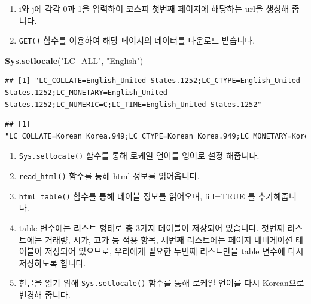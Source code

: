 \documentclass[]{book}
\newenvironment{Shaded}{\begin{snugshade}}{\end{snugshade}}
\newcommand{\DataTypeTok}[1]{\textcolor[rgb]{0.13,0.29,0.53}{#1}}
\newcommand{\DecValTok}[1]{\textcolor[rgb]{0.00,0.00,0.81}{#1}}
\newcommand{\KeywordTok}[1]{\textcolor[rgb]{0.13,0.29,0.53}{\textbf{#1}}}
\newcommand{\NormalTok}[1]{#1}
\newcommand{\OperatorTok}[1]{\textcolor[rgb]{0.81,0.36,0.00}{\textbf{#1}}}
\newcommand{\OtherTok}[1]{\textcolor[rgb]{0.56,0.35,0.01}{#1}}
\newcommand{\StringTok}[1]{\textcolor[rgb]{0.31,0.60,0.02}{#1}}
\providecommand{\tightlist}{%
  \setlength{\itemsep}{0pt}\setlength{\parskip}{0pt}}
\begin{document}
\begin{enumerate}
\def\labelenumi{\arabic{enumi}.}
\tightlist
\item
  i와 j에 각각 0과 1을 입력하여 코스피 첫번째 페이지에 해당하는 url을 생성해 줍니다.
\item
  \texttt{GET()} 함수를 이용하여 해당 페이지의 데이터를 다운로드 받습니다.
\end{enumerate}

\begin{Shaded}
\begin{Highlighting}[]
\KeywordTok{Sys.setlocale}\NormalTok{(}\StringTok{"LC_ALL"}\NormalTok{, }\StringTok{"English"}\NormalTok{)}
\end{Highlighting}
\end{Shaded}

\begin{verbatim}
## [1] "LC_COLLATE=English_United States.1252;LC_CTYPE=English_United States.1252;LC_MONETARY=English_United States.1252;LC_NUMERIC=C;LC_TIME=English_United States.1252"
\end{verbatim}

\begin{Shaded}
\end{Shaded}

\begin{verbatim}
## [1] "LC_COLLATE=Korean_Korea.949;LC_CTYPE=Korean_Korea.949;LC_MONETARY=Korean_Korea.949;LC_NUMERIC=C;LC_TIME=Korean_Korea.949"
\end{verbatim}

\begin{enumerate}
\def\labelenumi{\arabic{enumi}.}
\tightlist
\item
  \texttt{Sys.setlocale()} 함수를 통해 로케일 언어를 영어로 설정 해줍니다.
\item
  \texttt{read\_html()} 함수를 통해 html 정보를 읽어옵니다.
\item
  \texttt{html\_table()} 함수를 통해 테이블 정보를 읽어오며, fill=TRUE 를 추가해줍니다.
\item
  table 변수에는 리스트 형태로 총 3가지 테이블이 저장되어 있습니다. 첫번째 리스트에는 거래량, 시가, 고가 등 적용 항목, 세번째 리스트에는 페이지 네비게이션 테이블이 저장되어 있으므로, 우리에게 필요한 두번째 리스트만을 table 변수에 다시 저장하도록 합니다.
\item
  한글을 읽기 위해 \texttt{Sys.setlocale()} 함수를 통해 로케일 언어를 다시 Korean으로 변경해 줍니다.
\end{enumerate}
\end{document}
